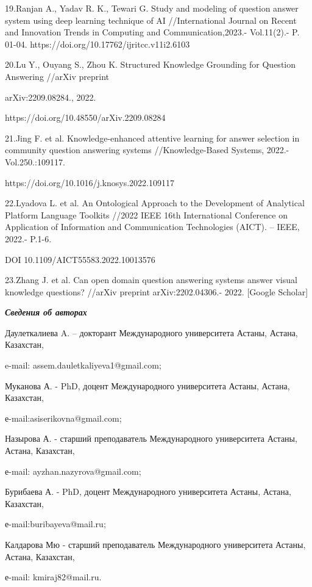 \begin{noparindent}
19.Ranjan A., Yadav R. K., Tewari G. Study and modeling of question
answer system using deep learning technique of AI //International
Journal on Recent and Innovation Trends in Computing and
Communication,2023.- Vol.11(2).- P. 01-04.
https://doi.org/10.17762/ijritcc.v11i2.6103

20.Lu Y., Ouyang S., Zhou K. Structured Knowledge Grounding for Question
Answering //arXiv preprint

arXiv:2209.08284., 2022.

https://doi.org/10.48550/arXiv.2209.08284

21.Jing F. et al. Knowledge-enhanced attentive learning for answer
selection in community question answering systems //Knowledge-Based
Systems, 2022.- Vol.250.:109117.

https://doi.org/10.1016/j.knosys.2022.109117

22.Lyadova L. et al. An Ontological Approach to the Development of
Analytical Platform Language Toolkits //2022 IEEE 16th International
Conference on Application of Information and Communication Technologies
(AICT). -- IEEE, 2022.- P.1-6.

DOI 10.1109/AICT55583.2022.10013576

23.Zhang J. et al. Can open domain question answering systems answer
visual knowledge questions? //arXiv preprint arXiv:2202.04306.- 2022.
{[}Google Scholar{]}
\end{noparindent}

\emph{{\bfseries Сведения об авторах}}

\begin{noparindent}
Даулеткалиева A. -- докторант Международного университета Астаны,
Астана, Казахстан,

e-mail: assem.dauletkaliyeva1@gmail.com;

Муканова А. - PhD, доцент Международного университета Астаны, Астана,
Казахстан,

е-mail:asiserikovna@gmail.com;

Назырова А. - старший преподаватель Международного университета Астаны,
Астана, Казахстан,

е-mail: ayzhan.nazyrova@gmail.com;

Бурибаева А. - PhD, доцент Международного университета Астаны, Астана,
Казахстан,

е-mail:buribayeva@mail.ru;

Калдарова Мю - старший преподаватель Международного университета Астаны,
Астана, Казахстан,

е-mail: kmiraj82@mail.ru.
\end{noparindent}

